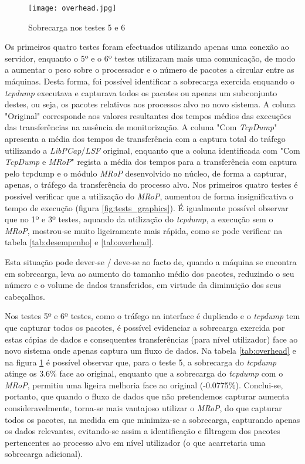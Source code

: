 \begin{figure}[!ht]
\centering
\texttt{[image: overhead.jpg]}
\caption{Sobrecarga nos testes 5 e 6 }
\label{fig:tests_overhead}
\end{figure}

Os primeiros quatro testes foram efectuados utilizando apenas uma conexão ao servidor, enquanto o 5º e o 6º testes utilizaram mais uma comunicação, de modo a aumentar o peso sobre o processador e o número de pacotes a circular entre as máquinas.
Desta forma, foi possível identificar a sobrecarga exercida enquando o \textit{tcpdump} executava e capturava todos os pacotes ou apenas um subconjunto destes, ou seja, os pacotes relativos aos processos alvo no novo sistema.
A coluna "Original" corresponde aos valores resultantes dos tempos médios das execuções das transferências na ausência de monitorização.
A coluna "Com \textit{TcpDump}" apresenta a média dos tempos de transferência com a captura total do tráfego utilizando a \textit{LibPCap}/\textit{LSF} original, enquanto que a coluna identificada com "Com \textit{TcpDump} e \textit{MRoP}" regista a média dos tempos para a transferência com captura pelo tcpdump e o módulo \textit{MRoP} desenvolvido no núcleo, de forma a capturar, apenas, o tráfego da transferência do processo alvo.
Nos primeiros quatro testes é possível verificar que a utilização do \textit{MRoP}, aumentou de forma insignificativa o tempo de execução (figura \ref{fig:tests_graphics}).
É igualmente possível observar que no 1º e 3º testes, aquando da utilização do \textit{tcpdump}, a execução sem o \textit{MRoP}, mostrou-se muito ligeiramente mais rápida, como se pode verificar na tabela \ref{tab:desempenho} e \ref{tab:overhead}.


Esta situação pode dever-se / deve-se ao facto de, quando a máquina se encontra em sobrecarga, leva ao aumento do tamanho médio dos pacotes, reduzindo o seu número e o volume de dados transferidos, em virtude da diminuição dos seus cabeçalhos.

Nos testes 5º e 6º testes, como o tráfego na interface é duplicado e o \textit{tcpdump} tem que capturar todos os pacotes, é possível evidenciar a sobrecarga exercida por estas cópias de dados e consequentes transferências (para nível utilizador) face ao novo sistema onde apenas captura um fluxo de dados.
Na tabela \ref{tab:overhead} e na figura \ref{fig:tests_overhead} é possível observar que, para o teste 5, a sobrecarga do \textit{tcpdump} atinge os 3.6\% face ao original, enquanto que a sobrecarga do \textit{tcpdump} com o \textit{MRoP}, permitiu uma ligeira melhoria face ao original (-0.0775\%).
Conclui-se, portanto, que quando o fluxo de dados que não pretendemos capturar aumenta consideravelmente, torna-se mais vantajoso utilizar o \textit{MRoP}, do que capturar todos os pacotes, na medida em que minimiza-se a sobrecarga, capturando apenas os dados relevantes, evitando-se assim a identificação e filtragem dos pacotes pertencentes ao processo alvo em nível utilizador (o que acarretaria uma sobrecarga adicional).

